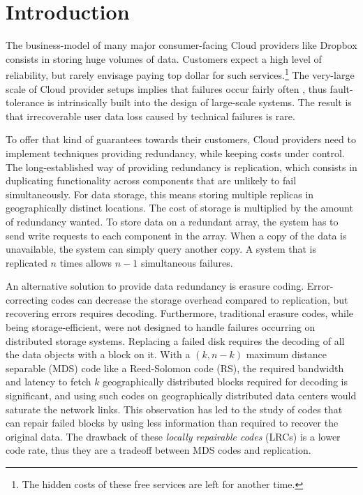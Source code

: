 \section{Introduction}
\label{sec:intro}

The business-model of many major consumer-facing Cloud providers like Dropbox consists in storing huge volumes of data. Customers expect a high level of reliability, but rarely envisage paying top dollar for such services.\footnote{The hidden costs of these free services are left for another time.} 
The very-large scale of Cloud provider setups implies that failures occur fairly often \autocite{failures-study}, thus fault-tolerance is intrinsically built into the design of large-scale systems. 
The result is that irrecoverable user data loss caused by technical failures is rare\autocite{racs}.

To offer that kind of guarantees towards their customers, Cloud providers need to implement techniques providing redundancy, while keeping costs under control. 
The long-established way of providing redundancy is replication, which consists in duplicating functionality across components that are unlikely to fail simultaneously. 
For data storage, this means storing multiple replicas in geographically distinct locations. 
The cost of storage is multiplied by the amount of redundancy wanted. 
To store data on a redundant array, the system has to send write requests to each component in the array. 
When a copy of the data is unavailable, the system can simply query another copy. 
A system that is replicated $n$ times allows $n-1$ simultaneous failures.

An alternative solution to provide data redundancy is erasure coding. 
Error-correcting codes can decrease the storage overhead compared to replication, but recovering errors requires decoding. 
Furthermore, traditional erasure codes, while being storage-efficient, were not designed to handle failures occurring on distributed storage systems. 
Replacing a failed disk requires the decoding of all the data objects with a block on it. With a $(k,n-k)$ maximum distance separable (MDS)\autocite{macwilliams1977theory} code like a Reed-Solomon code (RS), the required bandwidth and latency to fetch $k$ geographically distributed blocks required for decoding is significant, and using such codes on geographically distributed data centers would saturate the network links. 
This observation has led to the study of codes that can repair failed blocks by using less information than required to recover the original data. 
The drawback of these \emph{locally repairable codes} (LRCs)\autocite{papailiopoulos2014locally} is a lower code rate, thus they are a tradeoff between MDS codes and replication.

